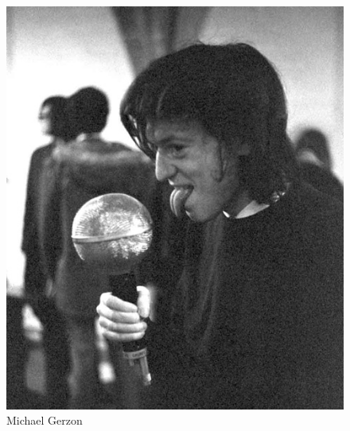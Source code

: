 \begin{figure}[hb]
\centering
\includegraphics[width=0.99\columnwidth]{CAPITOLI/1000/IMG/MAG-licking-G-web.jpg}
\caption{Michael Gerzon}
\label{ph:mg1}
\end{figure}

\clearpage

